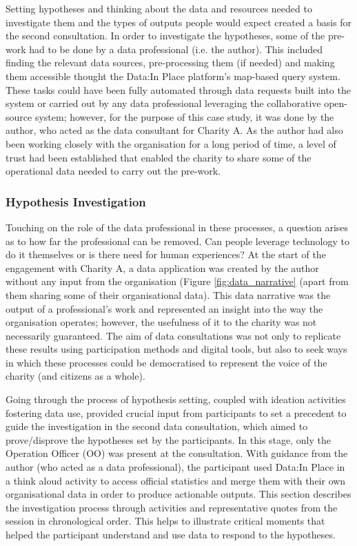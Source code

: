 Setting hypotheses and thinking about the data and resources needed to investigate them and the types of outputs people would expect created a basis for the second consultation. In order to investigate the hypotheses, some of the pre-work had to be done by a data professional (i.e. the author). This included finding the relevant data sources, pre-processing them (if needed) and making them accessible thought the Data:In Place platform's map-based query system. These tasks could have been fully automated through data requests built into the system or carried out by any data professional leveraging the collaborative open-source system; however, for the purpose of this case study, it was done by the author, who acted as the data consultant for Charity A. As the author had also been working closely with the organisation for a long period of time, a level of trust had been established that enabled the charity to share some of the operational data needed to carry out the pre-work.

\subsubsection{Hypothesis Investigation}
\label{sec:data_investigation}
Touching on the role of the data professional in these processes, a question arises as to how far the professional can be removed. Can people leverage technology to do it themselves or is there need for human experiences? At the start of the engagement with Charity A, a data application was created by the author without any input from the organisation (Figure \ref{fig:data_narrative} (apart from them sharing some of their organisational data). This data narrative was the output of a professional's work and represented an insight into the way the organisation operates; however, the usefulness of it to the charity was not necessarily guaranteed. The aim of data consultations was not only to replicate these results using participation methods and digital tools, but also to seek ways in which these processes could be democratised to represent the voice of the charity (and citizens as a whole).

Going through the process of hypothesis setting, coupled with ideation activities fostering data use, provided crucial input from participants to set a precedent to guide the investigation in the second data consultation, which aimed to prove/disprove the hypotheses set by the participants. In this stage, only the Operation Officer (OO) was present at the consultation. With guidance from the author (who acted as a data professional), the participant used Data:In Place in a think aloud activity to access official statistics and merge them with their own organisational data in order to produce actionable outputs. This section describes the investigation process through activities and representative quotes from the session in chronological order. This helps to illustrate critical moments that helped the participant understand and use data to respond to the hypotheses.


